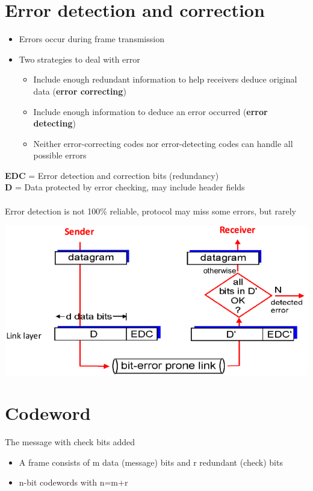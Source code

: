 \documentclass{article}[18pt]
\begin{document}
\section{Error detection and correction}
\begin{itemize}
	\item Errors occur during frame transmission
	\item Two strategies to deal with error
	\begin{itemize}
		\item Include enough redundant information to help receivers deduce original data (\textbf{error correcting})
		\item Include enough information to deduce an error occurred (\textbf{error detecting})
		\item Neither error-correcting codes nor error-detecting codes can handle all possible errors
	\end{itemize}
\end{itemize}
\textbf{EDC} = Error detection and correction bits (redundancy)\\
\textbf{D} = Data protected by error checking, may include header fields\\
\\
Error detection is not 100\% reliable, protocol may miss some errors, but rarely
\begin{center}
	\includegraphics[scale=0.7]{EDC}
\end{center}
\section{Codeword}
\begin{defin}[Codeword]
The message with check bits added	
\end{defin}
\begin{itemize}
	\item A frame consists of m data (message) bits and r redundant (check) bits
	\item n-bit codewords with n=m+r
\end{itemize}
\newpage
\end{document}
